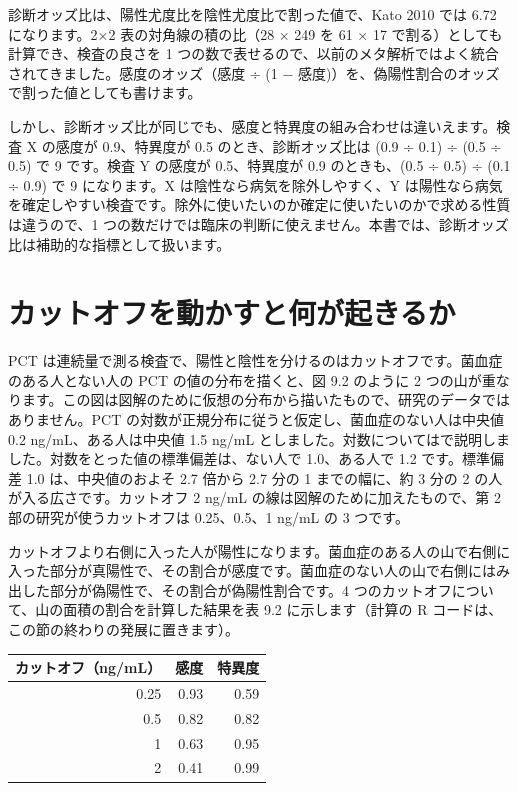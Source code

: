 診断オッズ比は、陽性尤度比を陰性尤度比で割った値で、Kato 2010 では 6.72 になります。2×2 表の対角線の積の比（28 × 249 を 61 × 17 で割る）としても計算でき、検査の良さを 1 つの数で表せるので、以前のメタ解析ではよく統合されてきました。感度のオッズ（感度 ÷ (1 − 感度)）を、偽陽性割合のオッズで割った値としても書けます。

しかし、診断オッズ比が同じでも、感度と特異度の組み合わせは違いえます。検査 X の感度が 0.9、特異度が 0.5 のとき、診断オッズ比は (0.9 ÷ 0.1) ÷ (0.5 ÷ 0.5) で 9 です。検査 Y の感度が 0.5、特異度が 0.9 のときも、(0.5 ÷ 0.5) ÷ (0.1 ÷ 0.9) で 9 になります。X は陰性なら病気を除外しやすく、Y は陽性なら病気を確定しやすい検査です。除外に使いたいのか確定に使いたいのかで求める性質は違うので、1 つの数だけでは臨床の判断に使えません。本書では、診断オッズ比は補助的な指標として扱います。

\section{カットオフを動かすと何が起きるか}
\label{sec:09-5}

PCT は連続量で測る検査で、陽性と陰性を分けるのはカットオフです。菌血症のある人とない人の PCT の値の分布を描くと、図 9.2 のように 2 つの山が重なります。この図は図解のために仮想の分布から描いたもので、研究のデータではありません。PCT の対数が正規分布に従うと仮定し、菌血症のない人は中央値 0.2 ng/mL、ある人は中央値 1.5 ng/mL としました。対数についてはで説明しました。対数をとった値の標準偏差は、ない人で 1.0、ある人で 1.2 です。標準偏差 1.0 は、中央値のおよそ 2.7 倍から 2.7 分の 1 までの幅に、約 3 分の 2 の人が入る広さです。カットオフ 2 ng/mL の線は図解のために加えたもので、第 2 部の研究が使うカットオフは 0.25、0.5、1 ng/mL の 3 つです。


カットオフより右側に入った人が陽性になります。菌血症のある人の山で右側に入った部分が真陽性で、その割合が感度です。菌血症のない人の山で右側にはみ出した部分が偽陽性で、その割合が偽陽性割合です。4 つのカットオフについて、山の面積の割合を計算した結果を表 9.2 に示します（計算の R コードは、この節の終わりの発展に置きます）。

\begin{kkcenter}
\begin{tabular}{rrr}
\toprule
カットオフ（ng/mL） & 感度 & 特異度 \\
\midrule
0.25 & 0.93 & 0.59 \\
0.5 & 0.82 & 0.82 \\
1 & 0.63 & 0.95 \\
2 & 0.41 & 0.99 \\
\bottomrule
\end{tabular}
\end{kkcenter}

